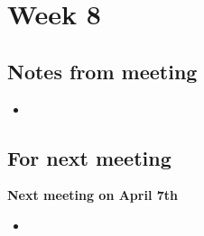 
\section{Week 8}

\subsection{Notes from meeting}

\begin{itemize}
\item
\end{itemize}

\subsection{For next meeting}

\textbf{Next meeting on April 7th}

\begin{itemize}
\item
\end{itemize}
